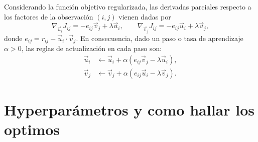 Considerando la función objetivo regularizada, las derivadas parciales respecto a los factores de la observación $(i,j)$ vienen dadas por
$$
\nabla_{\vec{u}_i} J_{ij} = -e_{ij}\vec{v}_j + \lambda \vec{u}_i, 
\qquad 
\nabla_{\vec{v}_j} J_{ij} = -e_{ij}\vec{u}_i + \lambda \vec{v}_j,
$$
donde $e_{ij} = r_{ij} - \vec{u}_i \cdot \vec{v}_j$. En consecuencia, dado un paso o tasa de aprendizaje $\alpha > 0$, las reglas de actualización en cada paso son:
$$
\begin{aligned}
	\vec{u}_i &\leftarrow \vec{u}_i + \alpha \left( e_{ij}\vec{v}_j - \lambda \vec{u}_i \right), \\
	\vec{v}_j &\leftarrow \vec{v}_j + \alpha \left( e_{ij}\vec{u}_i - \lambda \vec{v}_j \right).
\end{aligned}
$$

\section{Hyperparámetros y como hallar los optimos}
